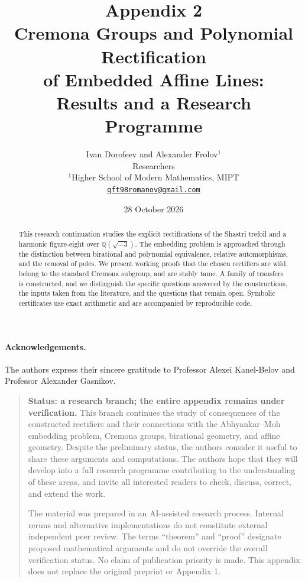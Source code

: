 \documentclass[11pt,a4paper]{article}
\title{\vspace{-12mm}\LARGE\bfseries Appendix 2\\[5pt]
 Cremona Groups and Polynomial Rectification\\
 of Embedded Affine Lines:\\[3pt]
 Results and a Research Programme}
\author{Ivan Dorofeev and Alexander Frolov$^{1}$\\[3pt]\normalsize Researchers\\
 \normalsize $^{1}$Higher School of Modern Mathematics, MIPT\\
 \normalsize\href{mailto:qft98romanov@gmail.com}{\texttt{qft98romanov@gmail.com}}}
\date{28 October 2026}
\theoremstyle{definition}
\theoremstyle{remark}
\newcommand{\Q}{{\mathbb Q}}
\begin{document}
\maketitle
\thispagestyle{empty}
\begin{abstract}
This research continuation studies the explicit rectifications of the Shastri
trefoil and a harmonic figure-eight over $\Q(\sqrt{-3})$. The embedding problem
is approached through the distinction between birational and polynomial
equivalence, relative automorphisms, and the removal of poles. We present
working proofs that the chosen rectifiers are wild, belong to the standard
Cremona subgroup, and are stably tame. A family of transfers is constructed,
and we distinguish the specific questions answered by the constructions,
the inputs taken from the literature, and the questions that remain open.
Symbolic certificates use exact arithmetic and are accompanied by
reproducible code.
\end{abstract}

\paragraph{Acknowledgements.}
The authors express their sincere gratitude to Professor Alexei Kanel-Belov
and Professor Alexander Gasnikov.


\begin{quote}\small
\textbf{Status: a research branch; the entire appendix remains under verification.}
This branch continues the study of consequences of the constructed rectifiers
and their connections with the Abhyankar--Moh embedding problem, Cremona
groups, birational geometry, and affine geometry. Despite the preliminary
status, the authors consider it useful to share these arguments and
computations. The authors hope that they will develop into a full research
programme contributing to the understanding of these areas, and invite
all interested readers to check, discuss, correct, and extend the work.

The material was prepared in an AI-assisted research process. Internal reruns
and alternative implementations do not constitute external independent peer
review. The terms ``theorem'' and ``proof'' designate proposed mathematical
arguments and do not override the overall verification status. No claim of
publication priority is made. This appendix does not replace the original
preprint or Appendix 1.
\end{quote}
\end{document}
